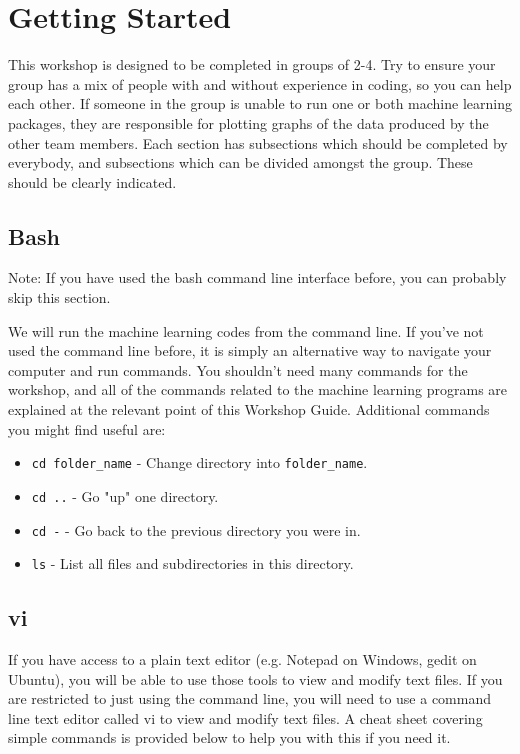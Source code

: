 \documentclass{article}
\begin{document}
\section{Getting Started}

This workshop is designed to be completed in groups of 2-4. Try to ensure your group has a mix of people with and without experience in coding, so you can help each other. If someone in the group is unable to run one or both machine learning packages, they are responsible for plotting graphs of the data produced by the other team members. Each section has subsections which should be completed by everybody, and subsections which can be divided amongst the group. These should be clearly indicated.

\subsection{Bash}
Note: If you have used the bash command line interface before, you can probably skip this section.

We will run the machine learning codes from the command line. If you've not used the command line before, it is simply an alternative way to navigate your computer and run commands. You shouldn't need many commands for the workshop, and all of the commands related to the machine learning programs are explained at the relevant point of this Workshop Guide. Additional commands you might find useful are:

\begin{itemize}

\item \verb|cd folder_name| - Change directory into \verb|folder_name|.
\item \verb|cd ..| - Go "up" one directory.
\item \verb|cd -| - Go back to the previous directory you were in.
\item \verb|ls| - List all files and subdirectories in this directory.

\end{itemize}

\subsection{vi}

If you have access to a plain text editor (e.g. Notepad on Windows, gedit on Ubuntu), you will be able to use those tools to view and modify text files. If you are restricted to just using the command line, you will need to use a command line text editor called vi to view and modify text files. A cheat sheet covering simple commands is provided below to help you with this if you need it.
\end{document}

